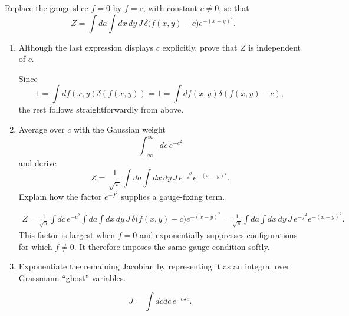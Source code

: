 Replace the gauge slice $f=0$ by $f=c$, with constant $c\neq0$, so that
\begin{equation}
    Z=\int da\int dx\,dy\,
    J\,\delta\!\bigl(f(x,y)-c\bigr)e^{-(x-y)^2}.
\end{equation}

\begin{enumerate}[label=\alph*),resume]
    \item Although the last expression displays $c$ explicitly, prove that $Z$
    is independent of $c$.
    \begin{solution}
        Since
        \begin{equation}
            1 = \int df(x,y) \delta(f(x,y)) = 1 = \int df(x,y) \delta(f(x,y)-c),
        \end{equation}
        the rest follows straightforwardly from above.
    \end{solution}

    \item Average over $c$ with the Gaussian weight
    \begin{equation}
        \int_{-\infty}^{\infty}dc\,e^{-c^2}
    \end{equation}
    and derive
    \begin{equation}
        Z=\frac{1}{\sqrt{\pi}}
        \int da\int dx\,dy\,
        J\,e^{-f^2}e^{-(x-y)^2}.
    \end{equation}
    Explain how the factor $e^{-f^2}$ supplies a gauge-fixing term.
    \begin{solution}
        \begin{equation}
            \begin{aligned}
                Z=\frac{1}{\sqrt{\pi}}\int dc\, e^{-c^2}\int da\int dx\,dy\,
    J\,\delta\!\bigl(f(x,y)-c\bigr)e^{-(x-y)^2} = \frac{1}{\sqrt{\pi}}
        \int da\int dx\,dy\,
        J\,e^{-f^2}e^{-(x-y)^2}.
            \end{aligned}
        \end{equation}
    This factor is largest when \(f=0\) and exponentially suppresses configurations for which \(f\neq0\). It therefore imposes the same gauge condition softly.
    \end{solution}

    \item Exponentiate the remaining Jacobian by representing it as an integral
    over Grassmann ``ghost'' variables.
    \begin{solution}
        \begin{equation}
            J = \int d\bar cdc \, e^{-\bar c J c}.
        \end{equation}
    \end{solution}
\end{enumerate}
